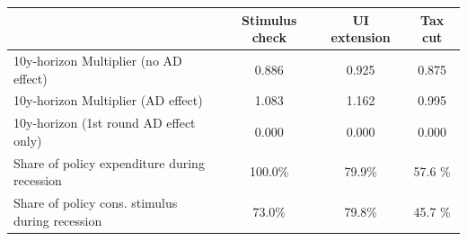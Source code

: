 \begin{tabular}{@{}lccc@{}} 
\toprule 
& Stimulus check    & UI extension    & Tax cut     \\  \midrule 
10y-horizon Multiplier (no AD effect) &0.886  & 0.925  & 0.875     \\ 
10y-horizon Multiplier (AD effect) &1.083  & 1.162  & 0.995     \\ 
10y-horizon (1st round AD effect only) &0.000  & 0.000  & 0.000     \\ 
Share of policy expenditure during recession &100.0\%  & 79.9\%  & 57.6 \%    \\ 
Share of policy cons. stimulus during recession &73.0\%  & 79.8\%  & 45.7 \%    \\ \bottomrule 
\end{tabular}  
